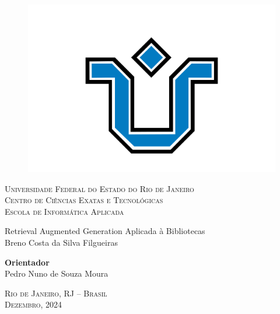 \documentclass[a4paper, 12pt]{article}
\begin{document}
\setcounter{page}{1}

\thispagestyle{empty}

    \begin{center}
        \begin{figure}
            \centering
            \includegraphics[scale=0.18]{unirio.png}
            \label{fig:unirio-logo}
        \end{figure}
        
        \fontsize{13}{15}
        
        \textsc{
            Universidade Federal do Estado do Rio de Janeiro\\
            Centro de Ciências Exatas e Tecnológicas\\
            Escola de Informática Aplicada\\
        }
        \vspace{2.8cm}
        
        Retrieval Augmented Generation Aplicada à Bibliotecas\\
        
        \vspace{2.8cm}
        Breno Costa da Silva Filgueiras
        \vspace{2.8cm}

        \begin{flushright}
            \textbf{Orientador}\\
            Pedro Nuno de Souza Moura
        \end{flushright}

        \vspace*{\fill}
        
        \textsc{Rio de Janeiro, RJ -- Brasil\\ Dezembro, 2024}
    \end{center}
\end{document}
